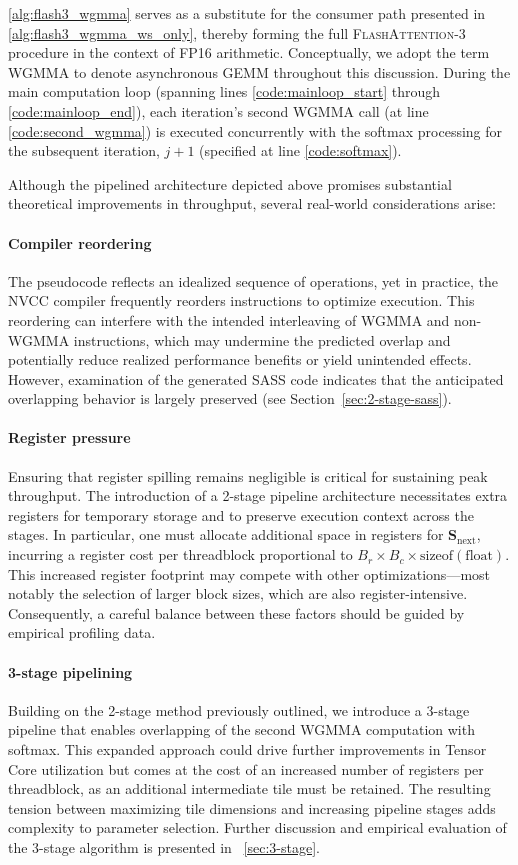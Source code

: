 \cref{alg:flash3_wgmma} serves as a substitute for the consumer path presented in \cref{alg:flash3_wgmma_ws_only}, thereby forming the full \textsc{FlashAttention-3} procedure in the context of FP16 arithmetic. Conceptually, we adopt the term WGMMA to denote asynchronous GEMM throughout this discussion. During the main computation loop (spanning lines \ref{code:mainloop_start} through \ref{code:mainloop_end}), each iteration’s second WGMMA call (at line \ref{code:second_wgmma}) is executed concurrently with the softmax processing for the subsequent iteration, $j+1$ (specified at line \ref{code:softmax}).

Although the pipelined architecture depicted above promises substantial theoretical improvements in throughput, several real-world considerations arise:

\paragraph{Compiler reordering} The pseudocode reflects an idealized sequence of operations, yet in practice, the NVCC compiler frequently reorders instructions to optimize execution. This reordering can interfere with the intended interleaving of WGMMA and non-WGMMA instructions, which may undermine the predicted overlap and potentially reduce realized performance benefits or yield unintended effects. However, examination of the generated SASS code indicates that the anticipated overlapping behavior is largely preserved (see Section~\ref{sec:2-stage-sass}).

\paragraph{Register pressure} Ensuring that register spilling remains negligible is critical for sustaining peak throughput. The introduction of a 2-stage pipeline architecture necessitates extra registers for temporary storage and to preserve execution context across the stages. In particular, one must allocate additional space in registers for $\mathbf{S}_{\mathrm{next}}$, incurring a register cost per threadblock proportional to $B_r \times B_c \times \text{sizeof}(\text{float})$. This increased register footprint may compete with other optimizations—most notably the selection of larger block sizes, which are also register-intensive. Consequently, a careful balance between these factors should be guided by empirical profiling data.

\paragraph{3-stage pipelining} Building on the 2-stage method previously outlined, we introduce a 3-stage pipeline that enables overlapping of the second WGMMA computation with softmax. This expanded approach could drive further improvements in Tensor Core utilization but comes at the cost of an increased number of registers per threadblock, as an additional intermediate tile must be retained. The resulting tension between maximizing tile dimensions and increasing pipeline stages adds complexity to parameter selection. Further discussion and empirical evaluation of the 3-stage algorithm is presented in ~\cref{sec:3-stage}.

